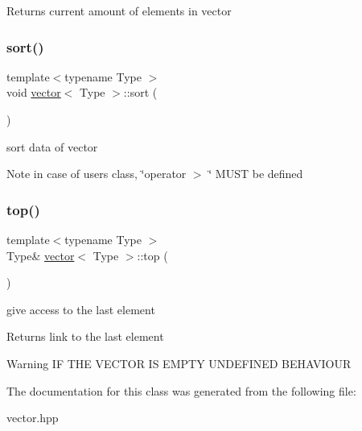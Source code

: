 \begin{DoxyReturn}{Returns}
current amount of elements in vector 
\end{DoxyReturn}
\mbox{\label{classvector_a07b7c89f4914f1558409e81ca0fe4e72}} 
\subsubsection{\texorpdfstring{sort()}{sort()}}
{\footnotesize\ttfamily template$<$typename Type $>$ \\
void \hyperlink{classvector}{vector}$<$ Type $>$\+::sort (\begin{DoxyParamCaption}{ }\end{DoxyParamCaption})}

sort data of vector \begin{DoxyNote}{Note}
in case of users class, \char`\"{}operator $>$ \char`\"{} M\+U\+ST be defined 
\end{DoxyNote}
\mbox{\label{classvector_aa9f52560c183491e8741ce10d7c54451}} 
\subsubsection{\texorpdfstring{top()}{top()}}
{\footnotesize\ttfamily template$<$typename Type $>$ \\
Type\& \hyperlink{classvector}{vector}$<$ Type $>$\+::top (\begin{DoxyParamCaption}{ }\end{DoxyParamCaption})}

give access to the last element \begin{DoxyReturn}{Returns}
link to the last element 
\end{DoxyReturn}
\begin{DoxyWarning}{Warning}
IF T\+HE V\+E\+C\+T\+OR IS E\+M\+P\+TY U\+N\+D\+E\+F\+I\+N\+ED B\+E\+H\+A\+V\+I\+O\+UR 
\end{DoxyWarning}


The documentation for this class was generated from the following file\+:\begin{DoxyCompactItemize}
\item 
vector.\+hpp\end{DoxyCompactItemize}
